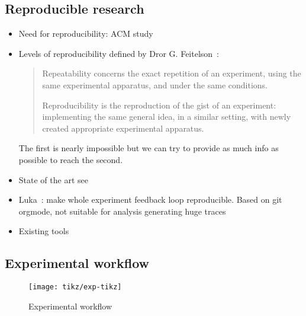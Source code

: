 \subsection{Reproducible research}

\begin{itemize}
    \item Need for reproducibility: ACM study \cite{Collberg15Repeatability}
    \item Levels of reproducibility defined by Dror G. Feitelson~\cite{Feitelson15From}:
        \begin{quotation}
            Repeatability concerns the exact repetition of an experiment, using the same experimental apparatus, and under the same conditions.

            Reproducibility is the reproduction of the gist of an experiment: implementing the same general idea, in a similar setting, with newly created appropriate experimental apparatus.
        \end{quotation}
        The first is nearly impossible but we can try to provide as much info
        as possible to reach the second.
    \item State of the art see \cite[Chapter~3, p17-19]{Stanisic15Reproducible}
    \item Luka~\cite[Chapter~4, p31-44]{Stanisic15Reproducible}: make whole experiment feedback
        loop reproducible. Based on git orgmode, not suitable for analysis
        generating huge traces
    \item Existing tools 
\end{itemize}


\subsection{Experimental workflow}

\begin{figure}[htb]
    \centering
    \texttt{[image: tikz/exp-tikz]}
    \caption{Experimental workflow}
    \label{fig:exp}
\end{figure}

